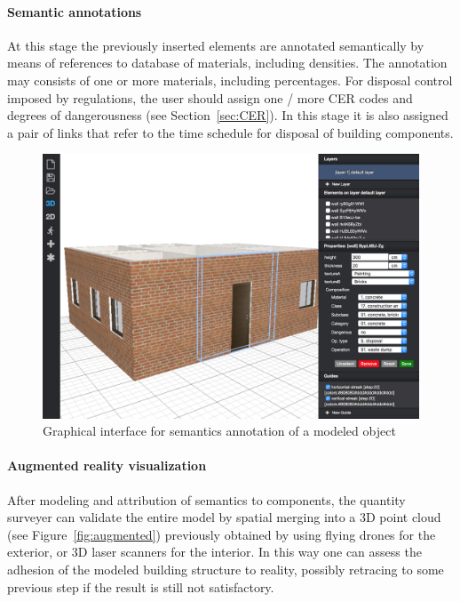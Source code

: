 \vspace{-2mm}\paragraph{Semantic annotations} 
At this stage the previously inserted elements are annotated semantically  by means of references to database of materials, including densities. The annotation may consists of one or more materials, including percentages.
For disposal control imposed by regulations, the user should assign one / more CER codes and degrees of dangerousness (see Section~\ref{sec:CER}).
In this stage it is also assigned a pair of links that refer to the time schedule for disposal of  building components.

\begin{figure}[!h]
  \centering
  \includegraphics[width=1\linewidth]{images/3d-sel}
  \caption{Graphical interface for semantics annotation of a modeled object}
  \label{fig:semantics}
\end{figure}

\vspace{-2mm}\paragraph{Augmented reality visualization} 
After modeling and attribution of semantics to components, the quantity surveyer can validate the entire model by spatial merging into a 3D point cloud (see Figure~\ref{fig:augmented}) previously obtained by using flying drones for the exterior, or 3D laser scanners for the interior. In this way one can assess the adhesion of the modeled building structure to reality, possibly retracing to some previous step if the result is still not satisfactory.

